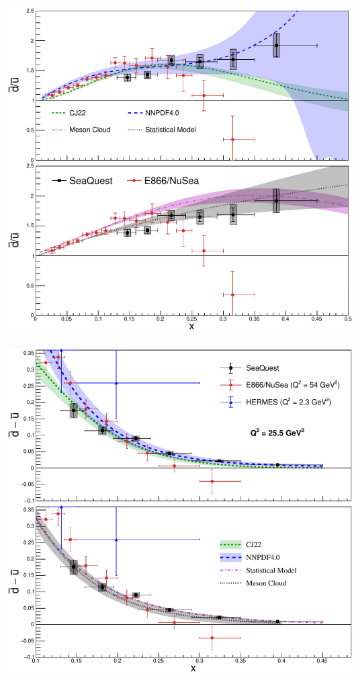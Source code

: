 \documentclass[reprint,aps,unsortedaddress,superscriptaddress,prl,floatfix,showpacs,linenumbers]{revtex4-2}
\begin{document}
\begin{figure}[htpb!]
	\centering
	\begin{subfigure}{0.45\linewidth}
		\includegraphics[width=\linewidth]{E906_E866_dbarubar.pdf}
	\end{subfigure}
	\begin{subfigure}{0.45\linewidth}
		\includegraphics[width=\linewidth]{dbub_diff_with_pdf_model_2pane.pdf}

\end{subfigure}
\end{figure}
\end{document}
